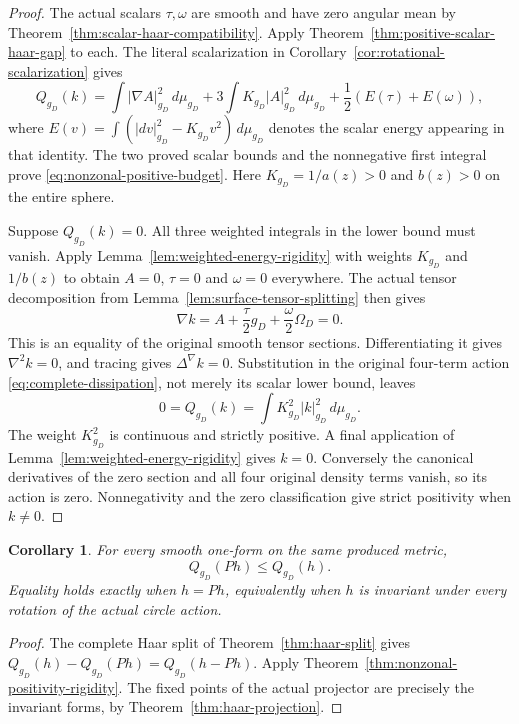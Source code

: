 \documentclass[11pt]{article}
\newtheorem{corollary}[theorem]{Corollary}
\begin{document}
\begin{proof}
The actual scalars $\tau,\omega$ are smooth and have zero angular mean by
Theorem~\ref{thm:scalar-haar-compatibility}. Apply
Theorem~\ref{thm:positive-scalar-haar-gap} to each. The literal scalarization
in Corollary~\ref{cor:rotational-scalarization} gives
\[
 Q_{g_D}(k)=\int|\nabla A|_{g_D}^2\,d\mu_{g_D}
        +3\int K_{g_D}|A|_{g_D}^2\,d\mu_{g_D}
        +\frac12\left(E(\tau)+E(\omega)\right),
\]
where $E(v)=\int(|dv|_{g_D}^2-K_{g_D}v^2)\,d\mu_{g_D}$ denotes the scalar
energy appearing in that identity. The two proved scalar bounds and the
nonnegative first integral prove \eqref{eq:nonzonal-positive-budget}.
Here $K_{g_D}=1/a(z)>0$ and $b(z)>0$ on the entire sphere.

Suppose $Q_{g_D}(k)=0$. All three weighted integrals in the lower bound must
vanish. Apply Lemma~\ref{lem:weighted-energy-rigidity} with weights $K_{g_D}$
and $1/b(z)$ to obtain $A=0$, $\tau=0$ and $\omega=0$ everywhere.
The actual tensor decomposition from Lemma~\ref{lem:surface-tensor-splitting}
then gives
\[
 \nabla k=A+\frac{\tau}{2}g_D+\frac{\omega}{2}\Omega_D=0.
\]
This is an equality of the original smooth tensor sections. Differentiating it
gives $\nabla^2k=0$, and tracing gives $\Delta^\nabla k=0$.
Substitution in the original four-term action \eqref{eq:complete-dissipation},
not merely its scalar lower bound, leaves
\[
 0=Q_{g_D}(k)=\int K_{g_D}^2|k|_{g_D}^2\,d\mu_{g_D}.
\]
The weight $K_{g_D}^2$ is continuous and strictly positive. A final application
of Lemma~\ref{lem:weighted-energy-rigidity} gives $k=0$.
Conversely the canonical derivatives of the zero section and all four original
density terms vanish, so its action is zero. Nonnegativity and the zero
classification give strict positivity when $k\ne0$.
\end{proof}

\begin{corollary}\label{cor:haar-action-comparison}
For every smooth one-form on the same produced metric,
\[
 Q_{g_D}(Ph)\leq Q_{g_D}(h).
\]
Equality holds exactly when $h=Ph$, equivalently when $h$ is invariant under
every rotation of the actual circle action.
\end{corollary}

\begin{proof}
The complete Haar split of Theorem~\ref{thm:haar-split} gives
$Q_{g_D}(h)-Q_{g_D}(Ph)=Q_{g_D}(h-Ph)$.
Apply Theorem~\ref{thm:nonzonal-positivity-rigidity}. The fixed points of the
actual projector are precisely the invariant forms, by
Theorem~\ref{thm:haar-projection}.
\end{proof}
\end{document}
